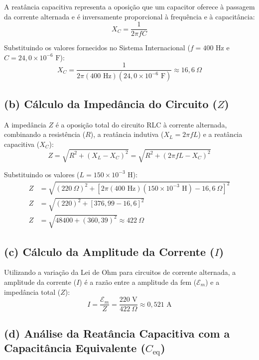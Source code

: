 \documentclass[12pt,a4paper]{article}
\begin{document}
A reatância capacitiva representa a oposição que um capacitor oferece à passagem da corrente alternada e é inversamente proporcional à frequência e à capacitância:
\begin{equation*}
X_C = \frac{1}{2\pi f C}
\end{equation*}

Substituindo os valores fornecidos no Sistema Internacional ($f = 400\text{ Hz}$ e $C = 24,0 \times 10^{-6}\text{ F}$):
\begin{equation*}
X_C = \frac{1}{2\pi (400\text{ Hz})(24,0 \times 10^{-6}\text{ F})} \approx 16,6\ \Omega
\end{equation*}

\subsection*{(b) Cálculo da Impedância do Circuito ($Z$)}

A impedância $Z$ é a oposição total do circuito RLC à corrente alternada, combinando a resistência ($R$), a reatância indutiva ($X_L = 2\pi f L$) e a reatância capacitiva ($X_C$):
\begin{equation*}
Z = \sqrt{R^2 + (X_L - X_C)^2} = \sqrt{R^2 + (2\pi f L - X_C)^2}
\end{equation*}

Substituindo os valores ($L = 150 \times 10^{-3}\text{ H}$):
\begin{align*}
Z &= \sqrt{(220\ \Omega)^2 + [2\pi(400\text{ Hz})(150 \times 10^{-3}\text{ H}) - 16,6\ \Omega]^2} \\
Z &= \sqrt{(220)^2 + [376,99 - 16,6]^2} \\
Z &= \sqrt{48400 + (360,39)^2} \approx 422\ \Omega
\end{align*}

\subsection*{(c) Cálculo da Amplitude da Corrente ($I$)}

Utilizando a variação da Lei de Ohm para circuitos de corrente alternada, a amplitude da corrente ($I$) é a razão entre a amplitude da fem ($\mathcal{E}_m$) e a impedância total ($Z$):
\begin{equation*}
I = \frac{\mathcal{E}_m}{Z} = \frac{220\text{ V}}{422\ \Omega} \approx 0,521\text{ A}
\end{equation*}

\subsection*{(d) Análise da Reatância Capacitiva com a Capacitância Equivalente ($C_{\text{eq}}$)}
\end{document}
